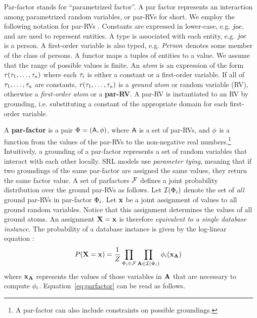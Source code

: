 \documentclass{IEEEtran}
\begin{document}
Par-factor stands for ``parametrized factor''. A par factor represents an interaction among parametrized random variables, or par-RVs for short. 
We employ the following notation 
for par-RVs \cite[2.2.5]{Kimmig2015}.
	Constants are expressed in lower-case, e.g. $\it{joe}$, and are used to represent entities. A type is associated with each entity, e.g. $\it{joe}$ is a person. 
A first-order variable is also typed, e.g. $\it{Person}$ denotes some member of the class of persons. A functor maps a tuples of entities to a value. We assume that the range of possible values is finite.  An {\em atom} is an expression of the form $r(\tau_{1},\ldots,\tau_{a})$ where each $\tau_{i}$ is either a constant or a first-order variable. If all of $\tau_{1},\ldots,\tau_{a}$ are constants, $r(\tau_{1},\ldots,\tau_{a})$ is a {\em ground atom} or random variable (RV), otherwise a {\em first-order atom} or a \textbf{par-RV}. A par-RV is instantiated to an RV by grounding, i.e. substituting a constant of the appropriate domain for each first-order variable. 

A \textbf{par-factor} is a pair $\Phi = (\mathsf{A},\phi)$, where $\mathsf{A}$ is a set of par-RVs, and $\phi$ is a function from the values of the par-RVs to the non-negative real numbers.\footnote{A par-factor can also include constraints on possible groundings.} Intuitively, a grounding of a par-factor represents a set of random variables that interact with each other locally. SRL models use {\em parameter tying}, meaning that if two groundings of the same par-factor are assigned the same values, they return the same factor value. A set of parfactors $\mathcal{F}$ defines a joint probability distribution over the ground par-RVs as follows. Let $\mathcal{I}(\Phi_{i})$ denote the set of {\em all} ground par-RVs in par-factor $\Phi_{i}$. Let $\mathbf{x}$ be a joint assignment of values to all ground random variables. Notice that this assignment determines the values of all ground atoms. An assignment $\mathbf{X}=\mathbf{x}$ is therefore {\em equivalent to a single database instance}.
The probability of a database instance is given by the log-linear equation \cite[Eq.7]{Kimmig2015}:
\begin{equation} \label{eq:parfactor}
P(\set{X}=\set{x}) = \frac{1}{Z} \prod_{\parfactor_{i} \in \parfactors} \prod_{\gparrvs \in \instantiations(\parfactor_{i})} 
\potential_{i}(\set{x}_{\gparrvs}) 
\end{equation}
where $\mathbf{x}_{\mathbf{A}}$ represents the values of those variables in $\mathbf{A}$ that are necessary to compute $\phi_{i}$. 
Equation~\ref{eq:parfactor} can be read as follows.
\end{document}

